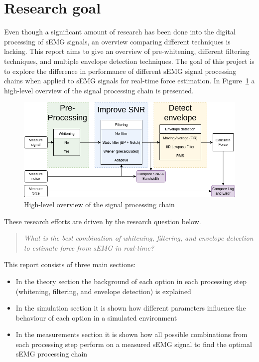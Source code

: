 \section{Research goal}
Even though a significant amount of research has been done into the digital processing of sEMG signals, an overview comparing different techniques is lacking. This report aims to give an overview of pre-whitening, different filtering techniques, and multiple envelope detection techniques. The goal of this project is to explore the difference in performance of different sEMG signal processing chains when applied to sEMG signals for real-time force estimation.
In Figure~\ref{fig:global_thesis_flowchart} a high-level overview of the signal processing chain is presented. 

\begin{figure}[h!t]
	\begin{center}
		\includegraphics[width=1.0\columnwidth]{images/global_thesis_flowchart.png}
	\end{center}
	\caption{High-level overview of the signal processing chain}
	\label{fig:global_thesis_flowchart}
\end{figure}

These research efforts are driven by the research question below.

\begin{quote}\emph{What is the best combination of whitening, filtering, and envelope detection to estimate force from sEMG in real-time? }\end{quote}

This report consists of three main sections:
\begin{itemize}
    \item In the theory section the background of each option in each processing step (whitening, filtering, and envelope detection) is explained
    \item In the simulation section it is shown how different parameters influence the behaviour of each option in a simulated environment
    \item In the measurements section it is shown how all possible combinations from each processing step perform on a measured sEMG signal to find the optimal sEMG processing chain
\end{itemize}

